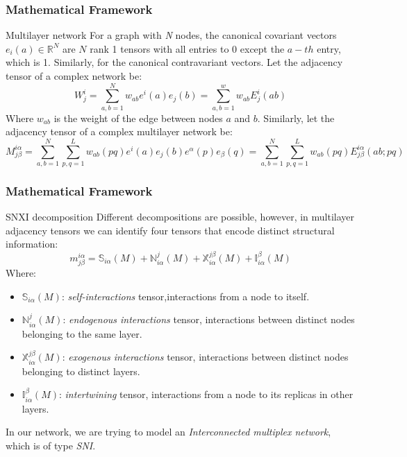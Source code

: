 \begin{frame}
\frametitle{Mathematical Framework}
    \begin{definition}{Multilayer network}
        For a graph with \textit{N} nodes, the canonical covariant vectors $e_i(a)\in\mathbb{R}^{N}$ are $N$ rank 1 tensors with all entries to 0 except the $a-th$ entry, which is 1. 
        Similarly, for the canonical contravariant vectors.
        Let the adjacency tensor of a complex network be:
        \begin{equation}
            W_j^i=\sum_{a,b=1}^{N}w_{ab}e^i(a)e_j(b)=\sum_{a,b=1}^{w}w_{ab}E_j^i(ab)
        \end{equation}
        Where $w_{ab}$ is the weight of the edge between nodes $a$ and $b$.
        Similarly, let the adjacency tensor of a complex multilayer network be: 
        \begin{equation}
            M_{j\beta}^{i\alpha}=\sum_{a,b=1}^{N}\sum_{p,q=1}^{L}w_{ab}(pq)e^i(a)e_j(b)e^\alpha(p)e_\beta(q)
                                =\sum_{a,b=1}^{N}\sum_{p,q=1}^{L}w_{ab}(pq)E_{j\beta}^{i\alpha}(ab;pq)      
        \end{equation}
    \end{definition}
\end{frame}
\begin{frame}
    \frametitle{Mathematical Framework}
    \begin{definition}{SNXI decomposition}
        Different decompositions are possible, however, in multilayer adjacency tensors we can identify four tensors that encode distinct structural information:
        \begin{equation}
            m_{j\beta}^{i\alpha} = \mathbb{S}_{i\alpha}(M) + \mathbb{N}_{i\alpha}^j(M) + \mathbb{X}_{i\alpha}^{j\beta}(M)+\mathbb{I}_{i\alpha}^{\beta}(M)
        \end{equation}
        Where:
        \footnotesize
        \begin{itemize}
            \item $\mathbb{S}_{i\alpha}(M)$: \textit{self-interactions} tensor,interactions from a node to itself.
            \item $\mathbb{N}_{i\alpha}^j(M)$: \textit{endogenous interactions} tensor, interactions between distinct nodes belonging to the same layer.
            \item $\mathbb{X}_{i\alpha}^{j\beta}(M)$: \textit{exogenous interactions} tensor, interactions between distinct nodes belonging to distinct layers.
            \item $\mathbb{I}_{i\alpha}^{\beta}(M)$: \textit{intertwining} tensor, interactions from a node to its replicas in other layers.
        \end{itemize}
        \normalsize
        In our network, we are trying to model an \textit{Interconnected multiplex network}, which is of type \textit{SNI}.
    \end{definition}
\end{frame}
